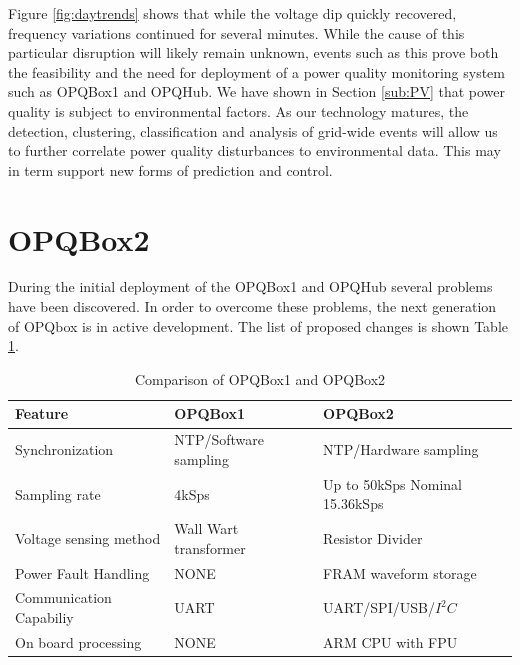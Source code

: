 Figure \ref{fig:daytrends} shows that while the voltage dip quickly recovered, frequency variations continued for several minutes. While the cause of this particular disruption will likely remain unknown, events such as this prove both the feasibility and the need for deployment of a power quality monitoring system such as OPQBox1 and OPQHub. We have shown in Section \ref{sub:PV} that power quality is subject to environmental factors. As our technology matures, the detection, clustering, classification and analysis of grid-wide events will allow us to further correlate power quality disturbances to environmental data. This may in term support new forms of prediction and control.


\section{OPQBox2}\label{chap:further}

During the initial deployment of the OPQBox1 and OPQHub several problems have been discovered. In order to overcome these problems, the next generation of OPQbox is in active development.
The list of proposed  changes is shown Table \ref{tbl:comp}. 

\begin{table}[h!]
\caption{Comparison of OPQBox1 and OPQBox2}
\label{tbl:comp}
\begin{tabular}{|l|l|l|}
\hline
\textbf{Feature}        & \textbf{OPQBox1}               & \textbf{OPQBox2}                     \\ \hline
Synchronization         & NTP/Software sampling    & NTP/Hardware sampling         				 	\\ \hline
Sampling rate           & 4kSps                 & Up to 50kSps Nominal 15.36kSps 					\\ \hline
Voltage sensing method  & Wall Wart transformer & Resistor Divider            					\\ \hline
Power Fault Handling    & NONE                  & FRAM waveform storage       					\\ \hline
Communication Capabiliy & UART                  & UART/SPI/USB/$I^2C$               					\\ \hline
On board processing     & NONE					& ARM CPU with FPU								\\ \hline
\end{tabular}
\end{table}

